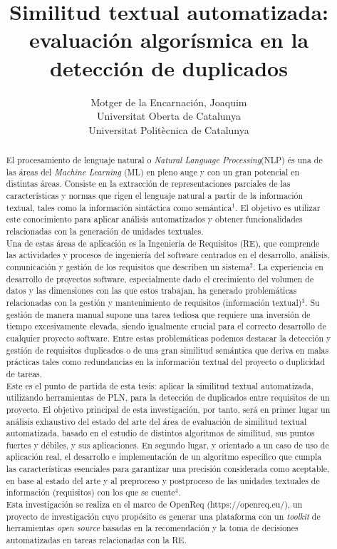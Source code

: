 \documentclass[a4paper]{article}
\title{Similitud textual automatizada:\\ evaluación algorísmica en la detección de duplicados}
\author{Motger de la Encarnación, Joaquim  \\
        \small Universitat Oberta de Catalunya \\
        \small Universitat Politècnica de Catalunya\\
}
\date{} %
\begin{document}
\maketitle

\begin{abstract}
El procesamiento de lenguaje natural o \textit{Natural Language Processing}(NLP) és una de las áreas del \textit{Machine Learning} (ML) en pleno auge y con un gran potencial en distintas áreas. Consiste en la extracción de representaciones parciales de las características y normas que rigen el lenguaje natural a partir de la información textual, tales como la información sintáctica como semántica$^{1}$. El objetivo es utilizar este conocimiento para aplicar análisis automatizados y obtener funcionalidades relacionadas con la generación de unidades textuales. \\

Una de estas áreas de aplicación es la Ingeniería de Requisitos (RE), que comprende las actividades y procesos de ingeniería del software centrados en el desarrollo, análisis, comunicación y gestión de los requisitos que describen un sistema$^{2}$. La experiencia en desarrollo de proyectos software, especialmente dado el crecimiento del volumen de datos y las dimensiones con las que estos trabajan, ha generado problemáticas relacionadas con la gestión y mantenimiento de requisitos (información textual)$^{3}$. Su gestión de manera manual supone una tarea tediosa que requiere una inversión de tiempo excesivamente elevada, siendo igualmente crucial para el correcto desarrollo de cualquier proyecto software. Entre estas problemáticas podemos destacar la detección y gestión de requisitos duplicados o de una gran similitud semántica que deriva en malas prácticas tales como redundancias en la información textual del proyecto o duplicidad de tareas. \\

Este es el punto de partida de esta tesis: aplicar la similitud textual automatizada, utilizando herramientas de PLN, para la detección de duplicados entre requisitos de un proyecto. El objetivo principal de esta investigación, por tanto, será en primer lugar un análisis exhaustivo del estado del arte del área de evaluación de similitud textual automatizada, basado en el estudio de distintos algoritmos de similitud, sus puntos fuertes y débiles, y sus aplicaciones. En segundo lugar, y orientado a un caso de uso de aplicación real, el desarrollo e implementación de un algoritmo específico que cumpla las características esenciales para garantizar una precisión considerada como aceptable, en base al estado del arte y al preproceso y postproceso de las unidades textuales de información (requisitos) con los que se cuente$^{4}$. \\

Esta investigación se realiza en el marco de OpenReq (https://openreq.eu/), un proyecto de investigación cuyo propósito es generar una plataforma con un \textit{toolkit} de herramientas \textit{open source} basadas en la recomendación y la toma de decisiones automatizadas en tareas relacionadas con la RE. 


\end{abstract} \hspace{10pt}
\end{document}

